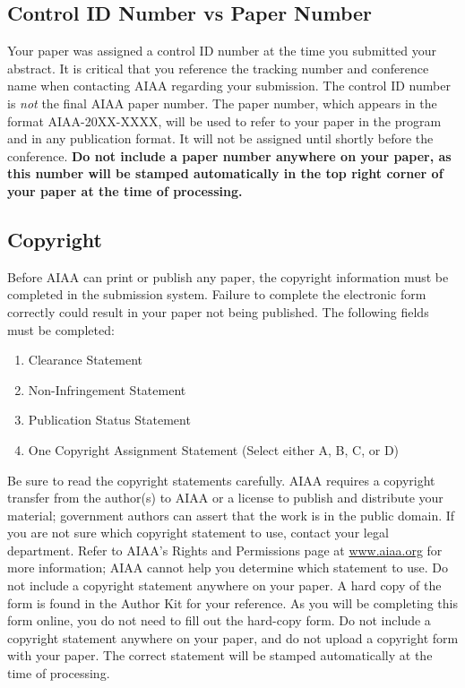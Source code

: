 \documentclass[conf]{new-aiaa}
\begin{document}
\subsection{Control ID Number vs Paper Number}

Your paper was assigned a control ID number at the time you submitted your abstract. It is critical that you reference the tracking number and conference name when contacting AIAA regarding your submission. The control ID number is \emph{not} the final AIAA paper number. The paper number, which appears in the format AIAA-20XX-XXXX, will be used to refer to your paper in the program and in any publication format. It will not be assigned until shortly before the conference. \textbf{Do not include a paper number anywhere on your paper, as this number will be stamped automatically in the top right corner of your paper at the time of processing.}

\subsection{Copyright}

Before AIAA can print or publish any paper, the copyright information must be completed in the submission system. Failure to complete the electronic form correctly could result in your paper not being published. The following fields must be completed:

\begin{enumerate}
\item Clearance Statement
\item Non-Infringement Statement
\item Publication Status Statement
\item One Copyright Assignment Statement (Select either A, B, C, or D)
\end{enumerate}

Be sure to read the copyright statements carefully. AIAA requires a copyright transfer from the author(s) to AIAA or a license to publish and distribute your material; government authors can assert that the work is in the public domain. If you are not sure which copyright statement to use, contact your legal department. Refer to AIAA’s Rights and Permissions page at \url{www.aiaa.org} for more information; AIAA cannot help you determine which statement to use. Do not include a copyright statement anywhere on your paper. A hard copy of the form is found in the Author Kit for your reference. As you will be completing this form online, you do not need to fill out the hard-copy form. Do not include a copyright statement anywhere on your paper, and do not upload a copyright form with your paper. The correct statement will be stamped automatically at the time of processing.
\end{document}
